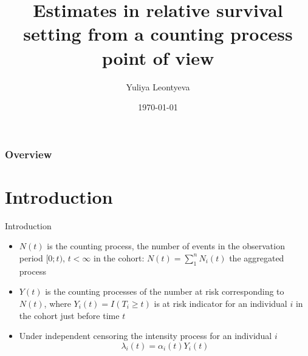 \documentclass{beamer}
\title{Estimates in relative survival setting from a counting process point of view}
\author{Yuliya Leontyeva}
\institute{Karolinska Institute, MEB}
\date{{\today}}
\begin{document}
\maketitle

\begin{frame}
\frametitle{Overview} %
\tableofcontents %
\end{frame}


\section{Introduction}

\begin{frame}{Introduction}
\small
\begin{itemize}
    \item $N(t)$ is the counting process, the number of events in the observation period $[0; t)$, $t < \infty$ in the cohort:
    $N(t) = \sum_1^n N_i(t)$ the aggregated process
    \item $Y(t)$ is the counting processes of the number at risk corresponding to $N(t)$, where $Y_{i}(t) = I(T_i \geq t)$ is at risk indicator for an individual $i$ in the cohort just before time $t$ 
    \item Under independent censoring the intensity process for an individual $i$  $$\lambda_i(t) = \alpha_i(t) Y_{i}(t)$$
 \end{itemize}
\end{frame}
 
\end{document}
